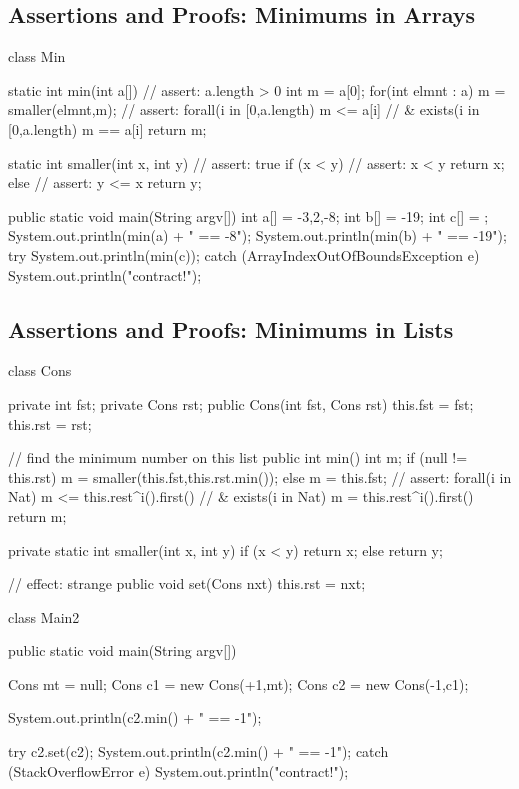 



\subsection*{Assertions and Proofs: Minimums in Arrays}

\begin{schemedisplay}
class Min {
    
    static int min(int a[]) { 
	// assert: a.length > 0 
	int m = a[0]; 
	for(int elmnt : a) 
	    m = smaller(elmnt,m);
	// assert: forall(i in [0,a.length){ m <= a[i] }
	//       & exists(i in [0,a.length){ m == a[i] }
	return m; 
    }

    static int smaller(int x, int y) {
	// assert: true
	if (x < y)
	    // assert: x < y 
	    return x; 
	else 
	    // assert: y <= x
	    return y; 
    }

    public static void main(String argv[]) { 
	int a[] = {-3,2,-8};
	int b[] = {-19};
	int c[] = {};
	System.out.println(min(a) + " == -8");
	System.out.println(min(b) + " == -19");
	try {
	    System.out.println(min(c)); 
	}
	catch (ArrayIndexOutOfBoundsException e) {
	    System.out.println("contract!"); 
	}
    }

}

\end{schemedisplay}

\subsection*{Assertions and Proofs: Minimums in Lists}

\begin{schemedisplay}
class Cons {
    private int  fst; 
    private Cons rst; 
    public Cons(int fst, Cons rst) { 
	this.fst = fst; 
	this.rst = rst; 
    }

    // find the minimum number on this list 
    public int min() { 
	int m; 
	if (null != this.rst)
	    m = smaller(this.fst,this.rst.min()); 
	else 
	    m = this.fst; 
	// assert: forall(i in Nat) { m <= this.rest^i().first() }
	//       & exists(i in Nat) { m = this.rest^i().first() }
	return m; 
    }

    private static int smaller(int x, int y) {
	if (x < y)
	    return x; 
	else 
	    return y; 
    }
    
    // effect: strange 
    public void set(Cons nxt) {
	this.rst = nxt; 
    }
}

class Main2 {
    public static void main(String argv[]) { 
	Cons mt = null; 
	Cons c1 = new Cons(+1,mt); 
	Cons c2 = new Cons(-1,c1); 

	System.out.println(c2.min() + " == -1");

	try {
	    c2.set(c2);
	    System.out.println(c2.min() + " == -1");
	}
	catch (StackOverflowError e) { 
	    System.out.println("contract!");
	}
    }
}


\end{schemedisplay}


